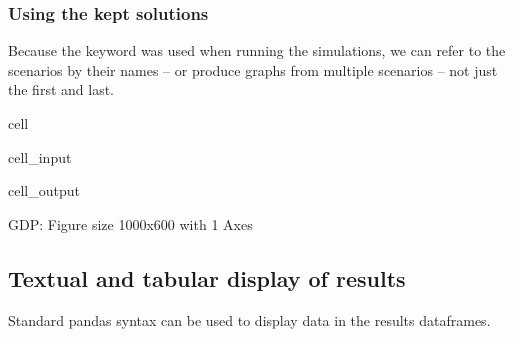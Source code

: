 \documentclass[letterpaper,10pt,english]{jupyterBook}
\begin{document}
\subsubsection{Using the kept solutions}
\label{\detokenize{content/03_Installation/TestingModelFlow:using-the-kept-solutions}}
\sphinxAtStartPar
Because the keyword  was used when running the simulations, we can refer to the scenarios by their names – or produce graphs from multiple scenarios – not just the first and last.

\begin{sphinxuseclass}{cell}\begin{sphinxVerbatimInput}

\begin{sphinxuseclass}{cell_input}
\begin{sphinxVerbatim}[commandchars=\\\{\}]
    
\end{sphinxVerbatim}

\end{sphinxuseclass}\end{sphinxVerbatimInput}
\begin{sphinxVerbatimOutput}

\begin{sphinxuseclass}{cell_output}
\noindent{}

\begin{sphinxVerbatim}[commandchars=\\\{\}]
\PYGZob{}\PYGZsq{}GDP\PYGZsq{}: \PYGZlt{}Figure size 1000x600 with 1 Axes\PYGZgt{}\PYGZcb{}
\end{sphinxVerbatim}

\end{sphinxuseclass}\end{sphinxVerbatimOutput}

\end{sphinxuseclass}

\subsection{Textual and tabular display of results}
\label{\detokenize{content/03_Installation/TestingModelFlow:textual-and-tabular-display-of-results}}
\sphinxAtStartPar
Standard pandas syntax can be used to display data in the results dataframes.
\end{document}
